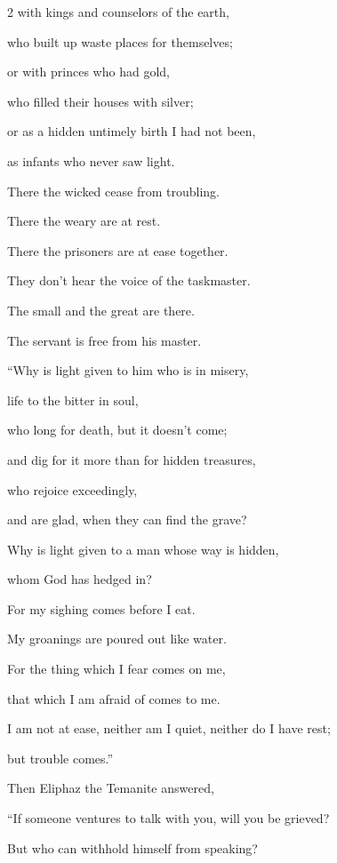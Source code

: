 \begin{multicols}{2}
	\myverse{}with kings and counselors of the earth,
	
	who built up waste places for themselves;
	
	\myverse{}or with princes who had gold,
	
	who filled their houses with silver;
	
	\myverse{}or as a hidden untimely birth I had not been,
	
	as infants who never saw light.
	
	\myverse{}There the wicked cease from troubling.
	
	There the weary are at rest.
	
	\myverse{}There the prisoners are at ease together.
	
	They don’t hear the voice of the taskmaster.
	
	\myverse{}The small and the great are there.
	
	The servant is free from his master.
	
	\vspace{\baselineskip}
	
	\myverse{}“Why is light given to him who is in misery,
	
	life to the bitter in soul,
	
	\myverse{}who long for death, but it doesn’t come;
	
	and dig for it more than for hidden treasures,
	
	\myverse{}who rejoice exceedingly,
	
	and are glad, when they can find the grave?
	
	\myverse{}Why is light given to a man whose way is hidden,
	
	whom God has hedged in?
	
	\myverse{}For my sighing comes before I eat.
	
	My groanings are poured out like water.
	
	\myverse{}For the thing which I fear comes on me,
	
	that which I am afraid of comes to me.
	
	\myverse{}I am not at ease, neither am I quiet, neither do I have rest;
	
	but trouble comes.”
	
	
	\mychapter{} \myverse*{}Then Eliphaz the Temanite answered,
	
	\myverse{}“If someone ventures to talk with you, will you be grieved?
	
	But who can withhold himself from speaking?
	

\end{multicols}
